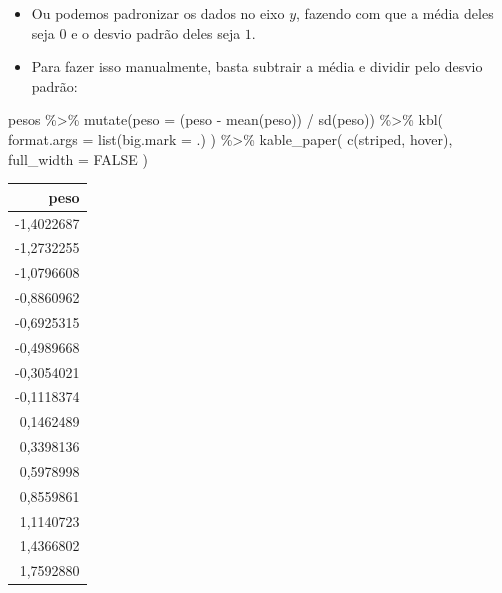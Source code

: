 \documentclass[
  11pt]{report}
\newenvironment{Shaded}{\begin{snugshade}}{\end{snugshade}}
\newcommand{\AttributeTok}[1]{\textcolor[rgb]{0.77,0.63,0.00}{#1}}
\newcommand{\ConstantTok}[1]{\textcolor[rgb]{0.00,0.00,0.00}{#1}}
\newcommand{\FunctionTok}[1]{\textcolor[rgb]{0.00,0.00,0.00}{#1}}
\newcommand{\NormalTok}[1]{#1}
\newcommand{\SpecialCharTok}[1]{\textcolor[rgb]{0.00,0.00,0.00}{#1}}
\newcommand{\StringTok}[1]{\textcolor[rgb]{0.31,0.60,0.02}{#1}}
\renewenvironment{Shaded}{
    \begin{mdframed}[%
      roundcorner=2pt,%
      innerleftmargin=5pt,%
      innerrightmargin=5pt,%
      topline=true,%
      leftline=true,%
      rightline=true,%
      bottomline=true,%
      linewidth=0.5pt,%
      linecolor=black!20,%
      backgroundcolor=black!2,%
      skipabove=2ex,%
      skipbelow=2.5ex%
    ]%
  }
  {
    \end{mdframed}
  }
\begin{document}
\begin{itemize}
\item
  Ou podemos padronizar os dados no eixo $y$, fazendo com que a média deles seja $0$ e o desvio padrão deles seja $1$.
\item
  Para fazer isso manualmente, basta subtrair a média e dividir pelo desvio padrão:
\end{itemize}

\begin{Shaded}
\begin{Highlighting}[]
\NormalTok{pesos }\SpecialCharTok{\%\textgreater{}\%} 
  \FunctionTok{mutate}\NormalTok{(}\AttributeTok{peso =}\NormalTok{ (peso }\SpecialCharTok{{-}} \FunctionTok{mean}\NormalTok{(peso)) }\SpecialCharTok{/} \FunctionTok{sd}\NormalTok{(peso)) }\SpecialCharTok{\%\textgreater{}\%} 
  \FunctionTok{kbl}\NormalTok{(}
    \AttributeTok{format.args =} \FunctionTok{list}\NormalTok{(}\AttributeTok{big.mark =} \StringTok{\textquotesingle{}.\textquotesingle{}}\NormalTok{)}
\NormalTok{  ) }\SpecialCharTok{\%\textgreater{}\%} 
  \FunctionTok{kable\_paper}\NormalTok{(}
    \FunctionTok{c}\NormalTok{(}\StringTok{\textquotesingle{}striped\textquotesingle{}}\NormalTok{, }\StringTok{\textquotesingle{}hover\textquotesingle{}}\NormalTok{),}
    \AttributeTok{full\_width =} \ConstantTok{FALSE}
\NormalTok{  )}
\end{Highlighting}
\end{Shaded}

\begin{table}
\centering
\begin{tabular}[t]{r}
\hline
peso\\
\hline
-1,4022687\\
\hline
-1,2732255\\
\hline
-1,0796608\\
\hline
-0,8860962\\
\hline
-0,6925315\\
\hline
-0,4989668\\
\hline
-0,3054021\\
\hline
-0,1118374\\
\hline
0,1462489\\
\hline
0,3398136\\
\hline
0,5978998\\
\hline
0,8559861\\
\hline
1,1140723\\
\hline
1,4366802\\
\hline
1,7592880\\
\hline
\end{tabular}
\end{table}
\end{document}
